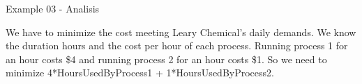 \begin{frame}{Example 03 - Analisis}

We have to minimize the cost meeting Leary Chemical's daily demands. We know
the duration hours and the cost per hour of each process. Running process 1 for
an hour costs \$4 and running process 2 for an hour costs \$1. So we need to minimize
4*HoursUsedByProcess1 + 1*HoursUsedByProcess2.

\end{frame}
